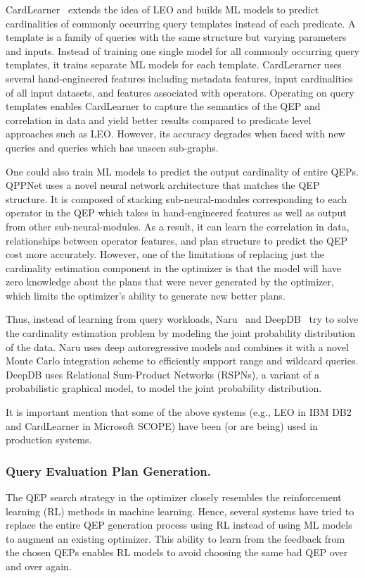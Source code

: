 CardLearner~\cite{cardlearner} extends the idea of LEO and builds ML models to predict cardinalities of commonly occurring query templates instead of each predicate.
A template is a family of queries with the same structure but varying parameters and inputs.
Instead of training one single model for all commonly occurring query templates, it trains separate ML models for each template.
CardLerarner uses several hand-engineered features including metadata features, input cardinalities of all input datasets, and features associated with operators.
Operating on query templates enables CardLearner to capture the semantics of the QEP and correlation in data and yield better results compared to predicate level approaches such as LEO.
However, its accuracy degrades when faced with new queries and queries which has unseen sub-graphs.


One could also train ML models to predict the output cardinality of entire QEPs.
QPPNet uses a novel neural network architecture that matches the QEP structure.
It is composed of stacking sub-neural-modules corresponding to each operator in the QEP which takes in hand-engineered features as well as output from other sub-neural-modules.
As a result, it can learn the correlation in data, relationships between operator features, and plan structure to predict the QEP cost more accurately.
However, one of the limitations of replacing just the cardinality estimation component in the optimizer is that the model will have zero knowledge about the plans that were never generated by the optimizer, which limits the optimizer's ability to generate new better plans.

Thus, instead of learning from query workloads, Naru~\cite{naru} and DeepDB~\cite{deepdb} try to solve the cardinality estimation problem by modeling the joint probability distribution of the data.
Naru uses deep autoregressive models and combines it with a novel Monte Carlo integration scheme to efficiently support range and wildcard queries.
DeepDB uses Relational Sum-Product Networks (RSPNs), a variant of a probabilistic graphical model, to model the joint probability distribution.

It is important mention that some of the above systems (e.g., LEO in IBM DB2 and CardLearner in Microsoft SCOPE) have been (or are being) used in production systems.


\subsubsection{Query Evaluation Plan Generation.} The QEP search strategy in the optimizer closely resembles the reinforcement learning (RL) methods in machine learning.
Hence, several systems have tried to replace the entire QEP generation process using RL instead of using ML models to augment an existing optimizer.
This ability to learn from the feedback from the chosen QEPs enables RL models to avoid choosing the same bad QEP over and over again.

